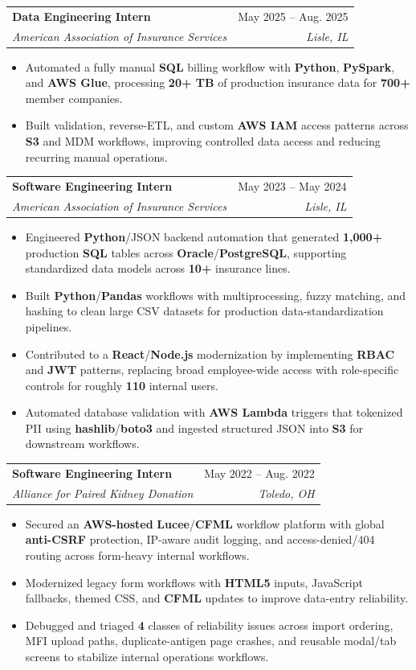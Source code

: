 \documentclass[letterpaper,11pt]{article}
\makeatletter
\newcommand{\resumeItem}[1]{
  \item\small{
    {#1 \vspace{-2pt}}
  }
}
\newcommand{\resumeSubheading}[4]{
  \vspace{-1pt}\item
    \begin{tabular*}{0.97\textwidth}[t]{l@{\extracolsep{\fill}}r}
      \textbf{#1} & #2 \\
      \textit{\small#3} & \textit{\small #4} \\
    \end{tabular*}\vspace{-3pt}
}
\newcommand{\resumeItemListStart}{\begin{itemize}[leftmargin=0.16in, itemsep=0pt, topsep=0pt, parsep=0pt]}
\newcommand{\resumeItemListEnd}{\end{itemize}\vspace{-5pt}}
\makeatother
\begin{document}
    \resumeSubheading
      {Data Engineering Intern}{May 2025 -- Aug. 2025}
      {American Association of Insurance Services}{Lisle, IL}
      \resumeItemListStart
        \resumeItem{Automated a fully manual \textbf{SQL} billing workflow with \textbf{Python}, \textbf{PySpark}, and \textbf{AWS Glue}, processing \textbf{20+ TB} of production insurance data for \textbf{700+} member companies.}
        \resumeItem{Built validation, reverse-ETL, and custom \textbf{AWS IAM} access patterns across \textbf{S3} and MDM workflows, improving controlled data access and reducing recurring manual operations.}
      \resumeItemListEnd

    \resumeSubheading
      {Software Engineering Intern}{May 2023 -- May 2024}
      {American Association of Insurance Services}{Lisle, IL}
      \resumeItemListStart
        \resumeItem{Engineered \textbf{Python}/JSON backend automation that generated \textbf{1,000+} production \textbf{SQL} tables across \textbf{Oracle}/\textbf{PostgreSQL}, supporting standardized data models across \textbf{10+} insurance lines.}
        \resumeItem{Built \textbf{Python}/\textbf{Pandas} workflows with multiprocessing, fuzzy matching, and hashing to clean large CSV datasets for production data-standardization pipelines.}
        \resumeItem{Contributed to a \textbf{React}/\textbf{Node.js} modernization by implementing \textbf{RBAC} and \textbf{JWT} patterns, replacing broad employee-wide access with role-specific controls for roughly \textbf{110} internal users.}
        \resumeItem{Automated database validation with \textbf{AWS Lambda} triggers that tokenized PII using \textbf{hashlib}/\textbf{boto3} and ingested structured JSON into \textbf{S3} for downstream workflows.}
      \resumeItemListEnd

    \resumeSubheading
      {Software Engineering Intern}{May 2022 -- Aug. 2022}
      {Alliance for Paired Kidney Donation}{Toledo, OH}
      \resumeItemListStart
        \resumeItem{Secured an \textbf{AWS-hosted} \textbf{Lucee}/\textbf{CFML} workflow platform with global \textbf{anti-CSRF} protection, IP-aware audit logging, and access-denied/404 routing across form-heavy internal workflows.}
        \resumeItem{Modernized legacy form workflows with \textbf{HTML5} inputs, JavaScript fallbacks, themed CSS, and \textbf{CFML} updates to improve data-entry reliability.}
        \resumeItem{Debugged and triaged \textbf{4} classes of reliability issues across import ordering, MFI upload paths, duplicate-antigen page crashes, and reusable modal/tab screens to stabilize internal operations workflows.}
      \resumeItemListEnd
\end{document}
